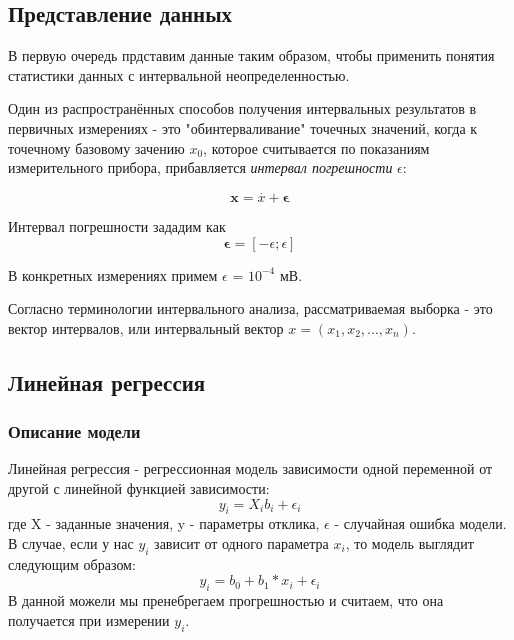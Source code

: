 \documentclass[main.tex]{subfiles}
\begin{document}
    \subsection{Представление данных}
        \noindent В первую очередь прдставим данные таким образом, чтобы применить понятия статистики данных с интервальной неопределенностью.
        
        \noindent Один из распространённых способов получения интервальных результатов в первичных измерениях - это "обинтерваливание" точечных значений, когда к точечному базовому зачению $x_0$, которое считывается по показаниям измерительного прибора, прибавляется
        \textit{интервал погрешности} $\epsilon$:
        
        \begin{equation}
            \textbf{x}=\overset{.}{x}+ \mathbf{\epsilon}
        \end{equation}
        
        \noindent Интервал погрешности зададим как
        \begin{equation*}
            \mathbf{\epsilon}=[-\epsilon;\epsilon]
        \end{equation*}
        
       \noindent  В конкретных измерениях примем $\epsilon$ = $10^{-4}$ мВ.
        
        \noindent Согласно терминологии интервального анализа, рассматриваемая выборка - это вектор интервалов, или интервальный вектор $x=(x_1, x_2, ..., x_n)$.
        
        \subsection{Линейная регрессия}
        \subsubsection{Описание модели}
        Линейная регрессия - регрессионная модель зависимости одной переменной от другой с линейной функцией зависимости:
        \begin{equation*}
            y_i = X_ib_i + \epsilon_i
        \end{equation*}
        где X - заданные значения, y - параметры отклика, $\epsilon$ - случайная ошибка модели.
        В случае, если у нас $y_i$ зависит от одного параметра $x_i$, то модель выглядит следующим образом:
        \begin{equation}
            y_i = b_0 + b_1*x_i + \epsilon_i
        \end{equation}
        В данной можели мы пренебрегаем прогрешностью и считаем, что она получается при измерении $y_i$.
        
\end{document}
